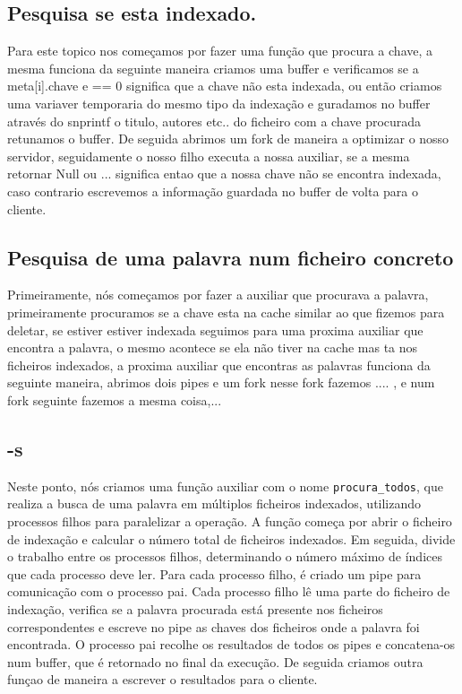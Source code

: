 \documentclass{llncs}
\begin{document}
\subsection{Pesquisa se esta indexado.}
Para este topico nos começamos por fazer uma função que procura a chave, a mesma funciona da seguinte maneira criamos uma buffer e verificamos se a meta[i].chave e == 0 significa que a chave não esta indexada, ou então criamos uma variaver temporaria do mesmo tipo da indexação e guradamos no buffer através do snprintf o titulo, autores etc.. do ficheiro com a chave procurada retunamos o buffer.
De seguida abrimos um fork de maneira a optimizar o nosso servidor, seguidamente o nosso filho executa a nossa auxiliar, se a mesma retornar Null ou ... significa entao que a nossa chave não se encontra indexada, caso contrario escrevemos a informação guardada no buffer de volta para o cliente. 

\subsection{Pesquisa de uma palavra num ficheiro concreto}
Primeiramente, nós começamos por fazer a auxiliar que procurava a palavra, primeiramente procuramos se a chave esta na cache similar ao que fizemos para deletar, se estiver estiver indexada seguimos para uma proxima auxiliar que encontra a palavra, o mesmo acontece se ela não tiver na cache mas ta nos ficheiros indexados, a proxima auxiliar que encontras as palavras funciona da seguinte maneira, abrimos dois pipes e um fork nesse fork fazemos .... , e num fork seguinte fazemos a mesma coisa,... 


\subsection{-s}
Neste ponto, nós criamos uma função auxiliar com o nome \texttt{procura\_todos}, que realiza a busca de uma palavra em múltiplos ficheiros indexados, utilizando processos filhos para paralelizar a operação. A função começa por abrir o ficheiro de indexação e calcular o número total de ficheiros indexados. Em seguida, divide o trabalho entre os processos filhos, determinando o número máximo de índices que cada processo deve ler. Para cada processo filho, é criado um pipe para comunicação com o processo pai. Cada processo filho lê uma parte do ficheiro de indexação, verifica se a palavra procurada está presente nos ficheiros correspondentes e escreve no pipe as chaves dos ficheiros onde a palavra foi encontrada. O processo pai recolhe os resultados de todos os pipes e concatena-os num buffer, que é retornado no final da execução.
De seguida criamos outra funçao de maneira a escrever o resultados para o cliente.
\end{document}

